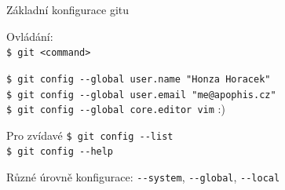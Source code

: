 \documentclass[
]{beamer}
\begin{document}
\begin{frame}{Základní konfigurace gitu}

Ovládání: \\
\texttt{\$ git <command>} \\
\vspace{1em}

\texttt{\$ git config -{}-global user.name "Honza Horacek"} \\
\texttt{\$ git config -{}-global user.email "me@apophis.cz"} \\
\texttt{\$ git config -{}-global core.editor vim} :)

\begin{block}{Pro zvídavé}
\texttt{\$ git config -{}-list} \\
\texttt{\$ git config -{}-help}

Různé úrovně konfigurace: \texttt{-{}-system}, \texttt{-{}-global}, \texttt{-{}-local}
\end{block}
\end{frame}
\end{document}
